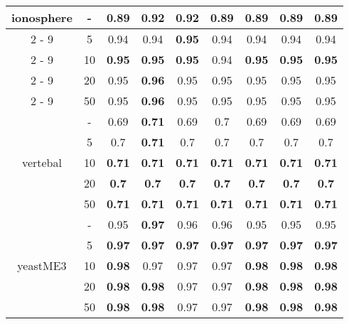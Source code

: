 \documentclass{article}%
\begin{document}
\begin{tabular}{c|c|ccccccc}
\hline%
\multirow{5}{*}{ionosphere}&{-}&0.89&\textbf{0.92}&\textbf{0.92}&0.89&0.89&0.89&0.89\\%
\cline{2%
-%
9}%
&5&0.94&0.94&\textbf{0.95}&0.94&0.94&0.94&0.94\\%
\cline{2%
-%
9}%
&10&\textbf{0.95}&\textbf{0.95}&\textbf{0.95}&0.94&\textbf{0.95}&\textbf{0.95}&\textbf{0.95}\\%
\cline{2%
-%
9}%
&20&0.95&\textbf{0.96}&0.95&0.95&0.95&0.95&0.95\\%
\cline{2%
-%
9}%
&50&0.95&\textbf{0.96}&0.95&0.95&0.95&0.95&0.95\\%
\hline%
\multirow{5}{*}{vertebal}&{-}&0.69&\textbf{0.71}&0.69&0.7&0.69&0.69&0.69\\%
\cline{2%
-%
9}%
&5&0.7&\textbf{0.71}&0.7&0.7&0.7&0.7&0.7\\%
\cline{2%
-%
9}%
&10&\textbf{0.71}&\textbf{0.71}&\textbf{0.71}&\textbf{0.71}&\textbf{0.71}&\textbf{0.71}&\textbf{0.71}\\%
\cline{2%
-%
9}%
&20&\textbf{0.7}&\textbf{0.7}&\textbf{0.7}&\textbf{0.7}&\textbf{0.7}&\textbf{0.7}&\textbf{0.7}\\%
\cline{2%
-%
9}%
&50&\textbf{0.71}&\textbf{0.71}&\textbf{0.71}&\textbf{0.71}&\textbf{0.71}&\textbf{0.71}&\textbf{0.71}\\%
\hline%
\multirow{5}{*}{yeastME3}&{-}&0.95&\textbf{0.97}&0.96&0.96&0.95&0.95&0.95\\%
\cline{2%
-%
9}%
&5&\textbf{0.97}&\textbf{0.97}&\textbf{0.97}&\textbf{0.97}&\textbf{0.97}&\textbf{0.97}&\textbf{0.97}\\%
\cline{2%
-%
9}%
&10&\textbf{0.98}&0.97&0.97&0.97&\textbf{0.98}&\textbf{0.98}&\textbf{0.98}\\%
\cline{2%
-%
9}%
&20&\textbf{0.98}&\textbf{0.98}&0.97&0.97&\textbf{0.98}&\textbf{0.98}&\textbf{0.98}\\%
\cline{2%
-%
9}%
&50&\textbf{0.98}&\textbf{0.98}&0.97&0.97&\textbf{0.98}&\textbf{0.98}&\textbf{0.98}\\%
\hline%
\end{tabular}

%
\end{document}
